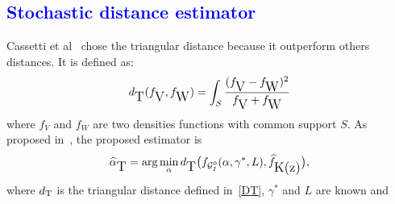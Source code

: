 \documentclass[a0,portrait]{a0poster}
\begin{document}
\begin{multicols}{3}
\section*{\textcolor{blue}{Stochastic distance estimator}}
Cassetti et al~\cite{APSAR2013ParameterEstimationStochasticDistances} chose the triangular distance because it outperform others distances. It is defined as:
\begin{equation}
d_{\text{\tiny{T}}}(f_\text{\tiny{V}},f_\text{\tiny{W}})=\int_{S}\frac{(f_\text{\tiny{V}}-f_\text{\tiny{W}})^2}{f_\text{\tiny{V}}+f_\text{\tiny{W}}}
\label{DT}
\end{equation}
where $f_V$ and $f_W$ are two densities functions with common support $S$. As proposed in~\cite{gambini2015}, the proposed estimator is
\begin{align}
\widehat{\alpha}_\text{{\tiny{T}}}= \arg\min_{\alpha} d_{\text{{\tiny{T}}}}\big(f_{\tiny\mathcal{G}_I^{0}}(\alpha,\gamma^*, L ), \widehat f_\text{\tiny{K(z)}}\big),
\label{minimization}
\end{align}
where $d_{\tiny{\text{T}}}$ is the triangular distance defined in~\eqref{DT}, $\gamma^*$ and $L$ are known and
\begin{center}
\end{center}



%
%


\end{multicols}
\end{document}
